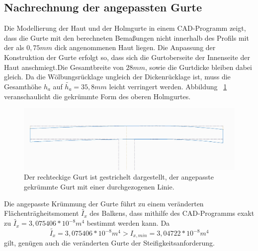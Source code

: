 \subsection{Nachrechnung der angepassten Gurte}
 Die Modellierung der Haut und der Holmgurte in einem CAD-Programm zeigt, dass die Gurte mit den berechneten Bemaßungen nicht innerhalb des Profils mit der als $ 0,75mm $ dick angenommenen Haut liegen. Die Anpassung der Konstruktion der Gurte erfolgt so, dass sich die Gurtoberseite der Innenseite der Haut anschmiegt.Die Gesamtbreite von $ 28mm $, sowie die Gurtdicke bleiben dabei gleich. Da die Wölbungsrücklage ungleich der Dickenrücklage ist, muss die Gesamthöhe $ h_{a} $ auf $ \tilde{h_{a}}=35,8mm $ leicht verringert werden. Abbildung ~\ref{fig: KrummerGurt} veranschaulicht die gekrümmte Form des oberen Holmgurtes.\\
 \begin{figure}[h]
 	\includegraphics[width=1.0\textwidth]{Bilder/KrummerGurt.jpg}
 	\caption{Der rechteckige Gurt ist gestrichelt dargestellt, der angepasste gekrümmte Gurt mit einer durchgezogenen Linie.}
 	\label{fig: KrummerGurt}
 \end{figure}

\noindent Die angepasste Krümmung der Gurte führt zu einem veränderten Flächenträgheitsmoment $ \tilde{I_{x}} $ des Balkens, dass mithilfe des CAD-Programms exakt zu $ \tilde{I_{x}}=3,075406*10^{-8}m^{4} $ bestimmt werden kann. Da 
\begin{equation}
	\label{IVergleich}
	\tilde{I_{x}}=3,075406*10^{-8}m^{4} > I_{x,min}=3,04722*10^{-8}m^{4}
\end{equation}
gilt, genügen auch die veränderten Gurte der Steifigkeitsanforderung.\\
 
